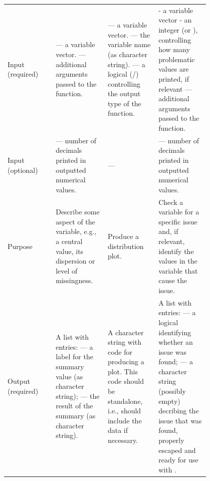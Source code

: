 \documentclass[article,shortnames]{jss}
\begin{document}
\begin{table}[htbp]
\footnotesize
\bgroup
\def\arraystretch{1.8}%
\begin{tabular}{L{0.2\linewidth}L{0.2\linewidth}L{0.2\linewidth}L{0.2\linewidth}}
&  &  &  \\
\hline
\vspace{0pt} Input (required) &  --- a variable vector.
                                \newline {} --- additional
                                arguments passed to the function.  &   --- a variable vector. \newline {} --- the variable name (as character string). \newline {} --- a logical (/) controlling the output type of the function. &  - a variable vector \newline {} - an integer (or ), controlling how many problematic values are printed, if relevant \newline {} --- additional arguments passed to the function. \\
Input (optional) &   --- number of decimals printed in outputted numerical values.  & --- &    --- number of decimals printed in outputted numerical values.  \\
Purpose & Describe some aspect of the variable, e.g., a central value, its dispersion or level of missingness. & Produce a distribution plot. & Check a variable for a specific issue and, if relevant, identify the values in the variable that cause the issue. \\
Output (required) & A list with entries: \newline {} --- a label for the summary value (as character string); \newline {} --- the result of the summary (as character string). & A character string with  code for producing a plot. This code should be standalone, i.e., should include the data if necessary. & A list with entries: \newline {} --- a logical identifying whether an issue was found; \newline {} --- a character string (possibly empty) decribing the issue that was found, properly escaped and ready for use with . \\

\end{tabular}
\end{table}
\end{document}
